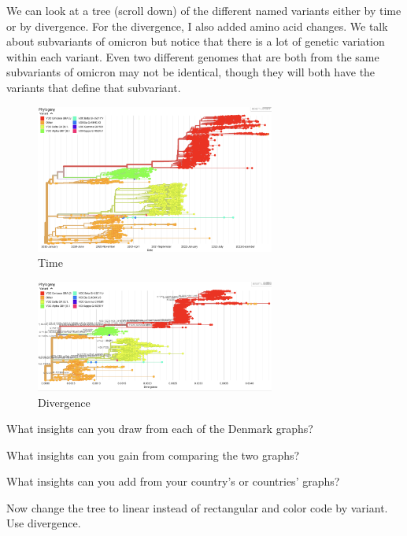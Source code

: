\documentclass[
]{book}
\begin{document}
\hfill\break

We can look at a tree (scroll down) of the different named variants either by time or by divergence. For the divergence, I also added amino acid changes. We talk about subvariants of omicron but notice that there is a lot of genetic variation within each variant. Even two different genomes that are both from the same subvariants of omicron may not be identical, though they will both have the variants that define that subvariant.

\begin{figure}
\centering
\includegraphics[width=0.7\textwidth,height=\textheight]{./Figures/DenmarkRectangularTime.png}
\caption{Time}
\end{figure}

\begin{figure}
\centering
\includegraphics[width=0.7\textwidth,height=\textheight]{./Figures/DenmarkRectangularDivergence.png}
\caption{Divergence}
\end{figure}

What insights can you draw from each of the Denmark graphs?

What insights can you gain from comparing the two graphs?

What insights can you add from your country's or countries' graphs?

\hfill\break

Now change the tree to linear instead of rectangular and color code by variant. Use divergence.
\end{document}
